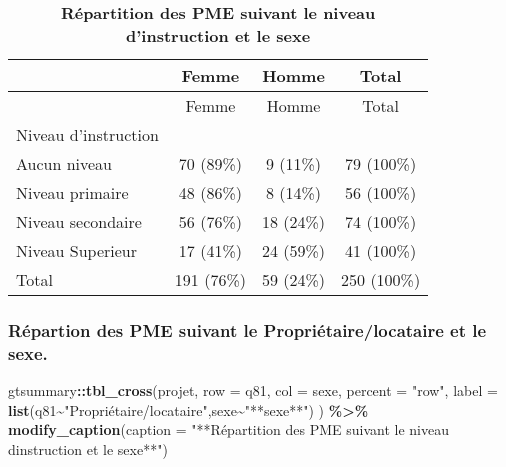 \documentclass[
]{article}
\newenvironment{Shaded}{\begin{snugshade}}{\end{snugshade}}
\newcommand{\AttributeTok}[1]{\textcolor[rgb]{0.13,0.29,0.53}{#1}}
\newcommand{\FunctionTok}[1]{\textcolor[rgb]{0.13,0.29,0.53}{\textbf{#1}}}
\newcommand{\NormalTok}[1]{#1}
\newcommand{\SpecialCharTok}[1]{\textcolor[rgb]{0.81,0.36,0.00}{\textbf{#1}}}
\newcommand{\StringTok}[1]{\textcolor[rgb]{0.31,0.60,0.02}{#1}}
\begin{document}
\begin{longtable}[]{@{}lccc@{}}
\caption{\textbf{Répartition des PME suivant le niveau d'instruction et
le sexe}}\tabularnewline
\toprule\noalign{}
& Femme & Homme & Total \\
\midrule\noalign{}
\endfirsthead
\toprule\noalign{}
& Femme & Homme & Total \\
\midrule\noalign{}
\endhead
\bottomrule\noalign{}
\endlastfoot
Niveau d'instruction & & & \\
Aucun niveau & 70 (89\%) & 9 (11\%) & 79 (100\%) \\
Niveau primaire & 48 (86\%) & 8 (14\%) & 56 (100\%) \\
Niveau secondaire & 56 (76\%) & 18 (24\%) & 74 (100\%) \\
Niveau Superieur & 17 (41\%) & 24 (59\%) & 41 (100\%) \\
Total & 191 (76\%) & 59 (24\%) & 250 (100\%) \\
\end{longtable}

\hypertarget{ruxe9partion-des-pme-suivant-le-propriuxe9tairelocataire-et-le-sexe.}{%
\subsubsection{Répartion des PME suivant le Propriétaire/locataire et le
sexe.}\label{ruxe9partion-des-pme-suivant-le-propriuxe9tairelocataire-et-le-sexe.}}

\begin{Shaded}
\begin{Highlighting}[]
\NormalTok{gtsummary}\SpecialCharTok{::}\FunctionTok{tbl\_cross}\NormalTok{(projet,}
    \AttributeTok{row =}\NormalTok{  q81,}
    \AttributeTok{col =}\NormalTok{ sexe,}
    \AttributeTok{percent =} \StringTok{"row"}\NormalTok{,}
    \AttributeTok{label =} \FunctionTok{list}\NormalTok{(q81}\SpecialCharTok{\textasciitilde{}}\StringTok{"Propriétaire/locataire"}\NormalTok{,sexe}\SpecialCharTok{\textasciitilde{}}\StringTok{"**sexe**"}\NormalTok{)}
\NormalTok{  ) }\SpecialCharTok{\%\textgreater{}\%} \FunctionTok{modify\_caption}\NormalTok{(}\AttributeTok{caption =} 
                         \StringTok{"**Répartition des PME suivant }
\StringTok{                       le niveau d\textquotesingle{}instruction et le sexe**"}\NormalTok{) }
\end{Highlighting}
\end{Shaded}
\end{document}
